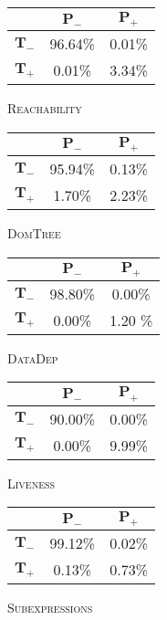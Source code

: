 \centering
\scriptsize
\renewcommand{\arraystretch}{1.5}
\begin{subfigure}{.19\linewidth}
  \centering
  \begin{tabular}{r | c c}
    \toprule
    & $\bm{P_-}$ & $\bm{P_+}$ \\
    \midrule
    $\bm{T_-}$ & 96.64\% & 0.01\% \\
    $\bm{T_+}$ & 0.01\% & 3.34\% \\
    \bottomrule
  \end{tabular}
  \caption{\textsc{Reachability}}
\end{subfigure}
\hfill
\begin{subfigure}{.19\linewidth}
  \centering
  \begin{tabular}{r | c c}
    \toprule
    & $\bm{P_-}$ & $\bm{P_+}$ \\
    \midrule
    $\bm{T_-}$ & 95.94\% & 0.13\% \\
    $\bm{T_+}$ & 1.70\% & 2.23\% \\
    \bottomrule
  \end{tabular}
  \caption{\textsc{DomTree}}
\end{subfigure}
\hfill
\begin{subfigure}{.19\linewidth}
  \centering
  \begin{tabular}{r | c c}
    \toprule
    & $\bm{P_-}$ & $\bm{P_+}$ \\
    \midrule
    $\bm{T_-}$ & 98.80\% & 0.00\% \\
    $\bm{T_+}$ & 0.00\% & 1.20 \% \\
    \bottomrule
  \end{tabular}
  \caption{\textsc{DataDep}}
\end{subfigure}
\hfill
\begin{subfigure}{.19\linewidth}
  \centering
  \begin{tabular}{r | c c}
    \toprule
    & $\bm{P_-}$ & $\bm{P_+}$ \\
    \midrule
    $\bm{T_-}$ & 90.00\% & 0.00\% \\
    $\bm{T_+}$ & 0.00\% & 9.99\% \\
    \bottomrule
  \end{tabular}
  \caption{\textsc{Liveness}}
\end{subfigure}
\hfill
\begin{subfigure}{.19\linewidth}
  \centering
  \begin{tabular}{r | c c}
    \toprule
    & $\bm{P_-}$ & $\bm{P_+}$ \\
    \midrule
    $\bm{T_-}$ & 99.12\% & 0.02\% \\
    $\bm{T_+}$ & 0.13\% & 0.73\% \\
    \bottomrule
  \end{tabular}
  \caption{\textsc{Subexpressions}}
\end{subfigure}
